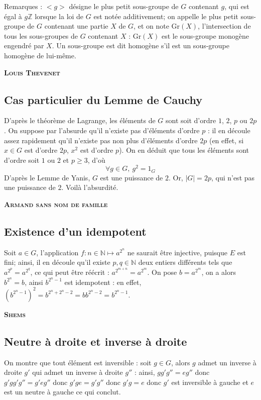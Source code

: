 \documentclass[17pt]{article}
\def\N{\mathbb N}
\def\Z{\mathbb Z}
\begin{document}
		Remarques : $<g>$ désigne le plus petit sous-groupe de $G$ contenant $g$, qui est égal à $g\Z$ lorsque la loi de $G$ est notée additivement; on appelle le plus petit sous-groupe de $G$ contenant une partie $X$ de $G$, et on note $\text{Gr}(X)$, l'intersection de tous les sous-groupes de $G$ contenant $X$ : $\text{Gr}(X)$ est le sous-groupe monogène engendré par $X$. Un sous-groupe est dit homogène s'il est un sous-groupe homogène de lui-même.

	\begin{center}
		\bfseries\Large\textsc{Louis Thevenet}
	\end{center}
	\subsection*{Cas particulier du Lemme de Cauchy}
		D'après le théorème de Lagrange, les éléments de $G$ sont soit d'ordre $1$, $2$, $p$ ou $2p$. On suppose par l'absurde qu'il n'existe pas d'éléments d'ordre $p$ : il en découle assez rapidement qu'il n'existe pas non plus d'éléments d'ordre $2p$ (en effet, si $x\in G$ est d'ordre $2p$, $x^2$ est d'ordre $p$). On en déduit que tous les éléments sont d'ordre soit $1$ ou $2$ et $p\geq 3$, d'où \[\forall g \in G,\ g^2=1_G\]
		D'après le Lemme de Yanis, $G$ est une puissance de $2$.
		Or, $|G|=2p$, qui n'est pas une puissance de $2$. Voilà l'absurdité.

	\begin{center}
		\bfseries\Large\textsc{Armand sans nom de famille}
	\end{center}
	\subsection*{Existence d'un idempotent}
	Soit $a\in G$, l'application $f:n\in \N\mapsto a^{2^n}$ ne saurait être injective, puisque $E$ est fini; ainsi, il en découle qu'il existe $p,q\in \N$ deux entiers différents tels que $a^{2^p}=a^{2^q}$, ce qui peut être réécrit : $a^{2^{m+n}}=a^{2^{m}}$. On pose $b=a^{2^{m}}$, on a alors $b^{2^n}=b$, ainsi $b^{2^n-1}$ est idempotent : en effet, $(b^{2^n-1})^2=b^{2^{n}+2^{n}-2}=bb^{2^n-2}=b^{2^n-1}$. 

	\begin{center}
		\bfseries\Large\textsc{Shems}
	\end{center}
	\subsection*{Neutre à droite et inverse à droite}
	On montre que tout élément est inversible : soit $g\in G$, alors $g$ admet un inverse à droite $g'$ qui admet un inverse à droite $g''$ : ainsi, $gg'g''=eg''$ donc  $g'gg'g''=g'eg''$ donc $g'ge=g'g''$ donc $g'g=e$ donc $g'$ est inversible à gauche et $e$ est un neutre à gauche ce qui conclut.
\end{document}
